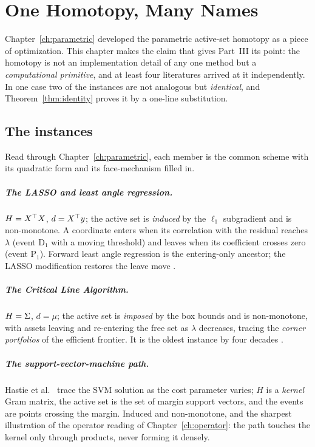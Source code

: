 \chapter{One Homotopy, Many Names}
\label{ch:homotopy}

Chapter~\ref{ch:parametric} developed the parametric active-set homotopy as a piece
of optimization. This chapter makes the claim that gives Part~III its point: the
homotopy is not an implementation detail of any one method but a \emph{computational
primitive}, and at least four literatures arrived at it independently. In one case
two of the instances are not analogous but \emph{identical}, and
Theorem~\ref{thm:identity} proves it by a one-line substitution.

\section{The instances}

Read through Chapter~\ref{ch:parametric}, each member is the common scheme with its
quadratic form and its face-mechanism filled in.

\paragraph{The LASSO and least angle regression.} $H = X^{\top} X$, $d = X^{\top} y$; the
active set is \emph{induced} by the $\ell_1$ subgradient and is non-monotone. A
coordinate enters when its correlation with the residual reaches $\lambda$ (event
$\mathrm{D}_1$ with a moving threshold) and leaves when its coefficient crosses zero
(event $\mathrm{P}_1$). Forward least angle regression is the entering-only
ancestor; the LASSO modification restores the leave move
\cite{efron2004,osborne2000,tibshirani1996}.

\paragraph{The Critical Line Algorithm.} $H = \Sigma$, $d = \mu$; the active set is
\emph{imposed} by the box bounds and is non-monotone, with assets leaving and
re-entering the free set as $\lambda$ decreases, tracing the \emph{corner
portfolios} of the efficient frontier. It is the oldest instance by four decades
\cite{markowitz1956,markowitz1959}.

\paragraph{The support-vector-machine path.} Hastie et al.\ \cite{hastie2004svm}
trace the SVM solution as the cost parameter varies; $H$ is a \emph{kernel} Gram
matrix, the active set is the set of margin support vectors, and the events are
points crossing the margin. Induced and non-monotone, and the sharpest illustration
of the operator reading of Chapter~\ref{ch:operator}: the path touches the kernel
only through products, never forming it densely.

